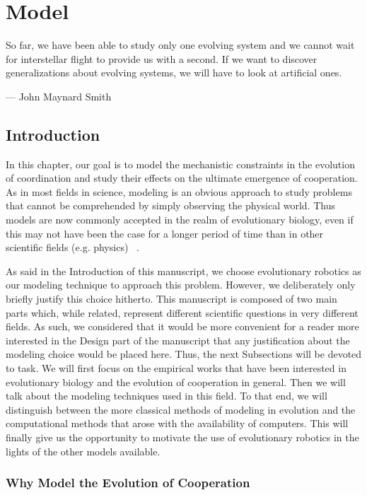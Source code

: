 \chapter{Model}
\label{chapter:model}

\epigraph{So far, we have been able to study only one evolving system and we cannot wait for interstellar flight to provide us with a second. If we want to discover generalizations about evolving systems, we will have to look at artificial ones.}{--- \textup{John Maynard Smith}}

\minitoc[n] %

\section{Introduction}

  In this chapter, our goal is to model the mechanistic constraints in the evolution of coordination and study their effects on the ultimate emergence of cooperation. As in most fields in science, modeling is an obvious approach to study problems that cannot be comprehended by simply observing the physical world. Thus models are now commonly accepted in the realm of evolutionary biology, even if this may not have been the case for a longer period of time than in other scientific fields (e.g. physics) ~\cite{Shou2015}. 

  As said in the Introduction of this manuscript, we choose evolutionary robotics as our modeling technique to approach this problem. However, we deliberately only briefly justify this choice hitherto. This manuscript is composed of two main parts which, while related, represent different scientific questions in very different fields. As such, we considered that it would be more convenient for a reader more interested in the Design part of the manuscript that any justification about the modeling choice would be placed here. Thus, the next Subsections will be devoted to task. We will first focus on the empirical works that have been interested in evolutionary biology and the evolution of cooperation in general. Then we will talk about the modeling techniques used in this field. To that end, we will distinguish between the more classical methods of modeling in evolution and the computational methods that arose with the availability of computers. This will finally give us the opportunity to motivate the use of evolutionary robotics in the lights of the other models available.


  \subsection{Why Model the Evolution of Cooperation}

